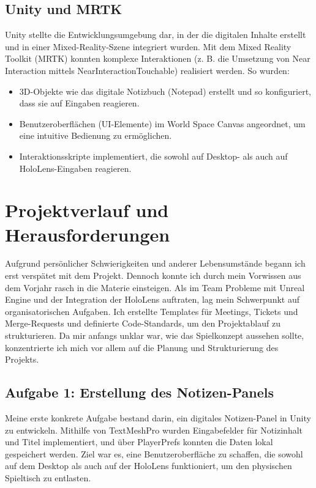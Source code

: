 \documentclass[11pt]{article}
\begin{document}
\subsection{Unity und MRTK}
Unity stellte die Entwicklungsumgebung dar, in der die digitalen Inhalte erstellt und in einer Mixed-Reality-Szene integriert wurden. Mit dem Mixed Reality Toolkit (MRTK) konnten komplexe Interaktionen (z. B. die Umsetzung von Near Interaction mittels NearInteractionTouchable) realisiert werden. So wurden:
\begin{itemize}[noitemsep]
    \item 3D-Objekte wie das digitale Notizbuch (Notepad) erstellt und so konfiguriert, dass sie auf Eingaben reagieren.
    \item Benutzeroberflächen (UI-Elemente) im World Space Canvas angeordnet, um eine intuitive Bedienung zu ermöglichen.
    \item Interaktionsskripte implementiert, die sowohl auf Desktop- als auch auf HoloLens-Eingaben reagieren.
\end{itemize}

\section{Projektverlauf und Herausforderungen}\label{sec:verlauf_herausforderungen}
Aufgrund persönlicher Schwierigkeiten und anderer Lebensumstände begann ich erst verspätet mit dem Projekt. Dennoch konnte ich durch mein Vorwissen aus dem Vorjahr rasch in die Materie einsteigen. Als im Team Probleme mit Unreal Engine und der Integration der HoloLens auftraten, lag mein Schwerpunkt auf organisatorischen Aufgaben. Ich erstellte Templates für Meetings, Tickets und Merge-Requests und definierte Code-Standards, um den Projektablauf zu strukturieren. Da mir anfangs unklar war, wie das Spielkonzept aussehen sollte, konzentrierte ich mich vor allem auf die Planung und Strukturierung des Projekts.

\subsection{Aufgabe 1: Erstellung des Notizen-Panels}
Meine erste konkrete Aufgabe bestand darin, ein digitales Notizen-Panel in Unity zu entwickeln. Mithilfe von TextMeshPro wurden Eingabefelder für Notizinhalt und Titel implementiert, und über PlayerPrefs konnten die Daten lokal gespeichert werden. Ziel war es, eine Benutzeroberfläche zu schaffen, die sowohl auf dem Desktop als auch auf der HoloLens funktioniert, um den physischen Spieltisch zu entlasten.
\end{document}
